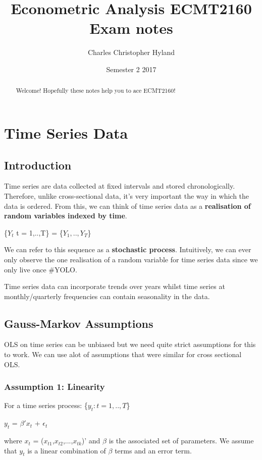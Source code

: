 \documentclass[11pt, oneside]{article}
\title{Econometric Analysis ECMT2160 Exam notes}
\author{Charles Christopher Hyland}
\date{Semester 2 2017}
\theoremstyle{definition}
\begin{document}
\maketitle
\begin{abstract}
Welcome! Hopefully these notes help you to ace ECMT2160!
\end{abstract}
\newpage
\tableofcontents
\newpage
{}

\section{Time Series Data}
\subsection{Introduction}
Time series are data collected at fixed intervals and stored chronologically. Therefore, unlike cross-sectional data, it's very important the way in which the data is ordered. From this, we can think of time series data as a \textbf{realisation of random variables indexed by time}.
\begin{center}
\{$Y_t$ \: t = 1,..,T\} = \{$Y_1,..,Y_T$\}
\end{center}
We can refer to this sequence as a \textbf{stochastic process}. Intuitively, we can ever only observe the one realisation of a random variable for time series data since we only live once \#YOLO.

Time series data can incorporate trends over years whilst time series at monthly/quarterly frequencies can contain seasonality in the data.\\

\subsection{Gauss-Markov Assumptions}
OLS on time series can be unbiased but we need quite strict assumptions for this to work. We can use alot of assumptions that were similar for cross sectional OLS.
\subsubsection{Assumption 1: Linearity}
For a time series process: \{$y_t : t = 1,..,T$\}
\begin{center}
  $y_t$ = \textbf{$\beta'x_t$} + $\epsilon_t$
\end{center}
where $x_t$ = ($x_{t1}$,$x_{t2}$,...,$x_{tk}$)' and $\beta$ is the associated set of parameters. We assume that $y_t$ is a linear combination of $\beta$ terms and an error term.
\end{document}
